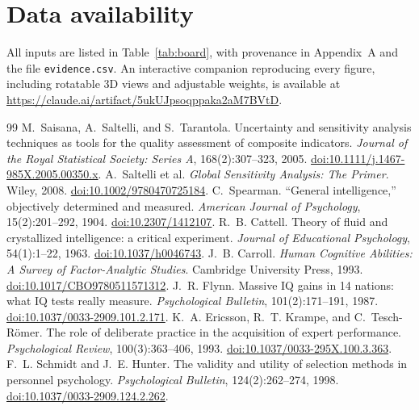 \documentclass[11pt]{article}
\begin{document}
\section*{Data availability}
All inputs are listed in Table~\ref{tab:board}, with provenance in Appendix~A and the file \texttt{evidence.csv}. An interactive companion reproducing every figure, including rotatable 3D views and adjustable weights, is available at \url{https://claude.ai/artifact/5ukUJpsoqppaka2aM7BVtD}.

\small
\begin{thebibliography}{99}\setlength{\itemsep}{1pt}
 M.~Saisana, A.~Saltelli, and S.~Tarantola. Uncertainty and sensitivity analysis techniques as tools for the quality assessment of composite indicators. \emph{Journal of the Royal Statistical Society: Series A}, 168(2):307--323, 2005. \href{https://doi.org/10.1111/j.1467-985X.2005.00350.x}{doi:10.1111/j.1467-985X.2005.00350.x}.
 A.~Saltelli et al. \emph{Global Sensitivity Analysis: The Primer}. Wiley, 2008. \href{https://doi.org/10.1002/9780470725184}{doi:10.1002/9780470725184}.
 C.~Spearman. ``General intelligence,'' objectively determined and measured. \emph{American Journal of Psychology}, 15(2):201--292, 1904. \href{https://doi.org/10.2307/1412107}{doi:10.2307/1412107}.
 R.~B. Cattell. Theory of fluid and crystallized intelligence: a critical experiment. \emph{Journal of Educational Psychology}, 54(1):1--22, 1963. \href{https://doi.org/10.1037/h0046743}{doi:10.1037/h0046743}.
 J.~B. Carroll. \emph{Human Cognitive Abilities: A Survey of Factor-Analytic Studies}. Cambridge University Press, 1993. \href{https://doi.org/10.1017/CBO9780511571312}{doi:10.1017/CBO9780511571312}.
 J.~R. Flynn. Massive IQ gains in 14 nations: what IQ tests really measure. \emph{Psychological Bulletin}, 101(2):171--191, 1987. \href{https://doi.org/10.1037/0033-2909.101.2.171}{doi:10.1037/0033-2909.101.2.171}.
 K.~A. Ericsson, R.~T. Krampe, and C.~Tesch-R\"omer. The role of deliberate practice in the acquisition of expert performance. \emph{Psychological Review}, 100(3):363--406, 1993. \href{https://doi.org/10.1037/0033-295X.100.3.363}{doi:10.1037/0033-295X.100.3.363}.
 F.~L. Schmidt and J.~E. Hunter. The validity and utility of selection methods in personnel psychology. \emph{Psychological Bulletin}, 124(2):262--274, 1998. \href{https://doi.org/10.1037/0033-2909.124.2.262}{doi:10.1037/0033-2909.124.2.262}.

\end{thebibliography}
\end{document}
